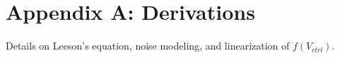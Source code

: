 \chapter{Appendix A: Derivations}
Details on Leeson's equation, noise modeling, and linearization of \(f(V_{ctrl})\).


